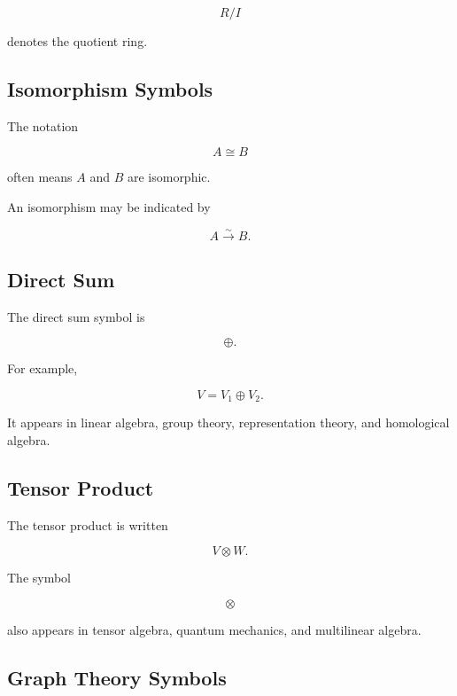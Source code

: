 \[
\boxed{
R/I
}
\]

denotes the quotient ring.

\subsection{Isomorphism Symbols}
\label{subsec:isomorphism-symbols-reference}

The notation

\[
\boxed{
A\cong B
}
\]

often means \(A\) and \(B\) are isomorphic.

An isomorphism may be indicated by

\[
\boxed{
A\xrightarrow{\sim}B.
}
\]

\subsection{Direct Sum}
\label{subsec:direct-sum-reference}

The direct sum symbol is

\[
\boxed{
\oplus.
}
\]

For example,

\[
\boxed{
V
=
V_1\oplus V_2.
}
\]

It appears in linear algebra, group theory, representation theory, and
homological algebra.

\subsection{Tensor Product}
\label{subsec:tensor-product-reference}

The tensor product is written

\[
\boxed{
V\otimes W.
}
\]

The symbol

\[
\otimes
\]

also appears in tensor algebra, quantum mechanics, and multilinear algebra.

\subsection{Graph Theory Symbols}
\label{subsec:graph-symbols-reference}

